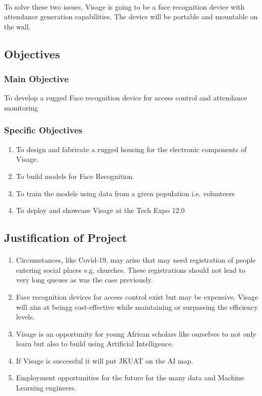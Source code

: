 \paragraph{}To solve these two issues, Visage is going to be a face recognition device with attendance generation capabilities. The device will be portable and mountable on the wall.

\subsection{Objectives}
\subsubsection{Main Objective}
To develop a rugged Face recognition device for access control and attendance monitoring
\subsubsection{Specific Objectives}
\begin{enumerate}
\item To design and fabricate a rugged housing for the electronic components of Visage.
\item To build models for Face Recognition.
\item To train the models using data from a given population i.e. volunteers
\item To deploy and showcase Visage at the Tech Expo 12.0
\end{enumerate}

\subsection{Justification of Project}
\paragraph{}\begin{enumerate}
\item Circumstances, like Covid-19, may arise that may need registration of people entering social places e.g. churches. These registrations should not lead to very long queues as was the case previously.
\item Face recognition devices for access control exist but may be expensive. Visage will aim at beingg cost-effective while maintaining or surpassing the efficiency levels.
\item Visage is an opportunity for young African scholars like ourselves to not only learn but also to build using Artificial Intelligence.
\item If Visage is successful it will put JKUAT on the AI map.
\item Employment opportunities for the future for the many data and Machine Learning engineers.
\end{enumerate}
